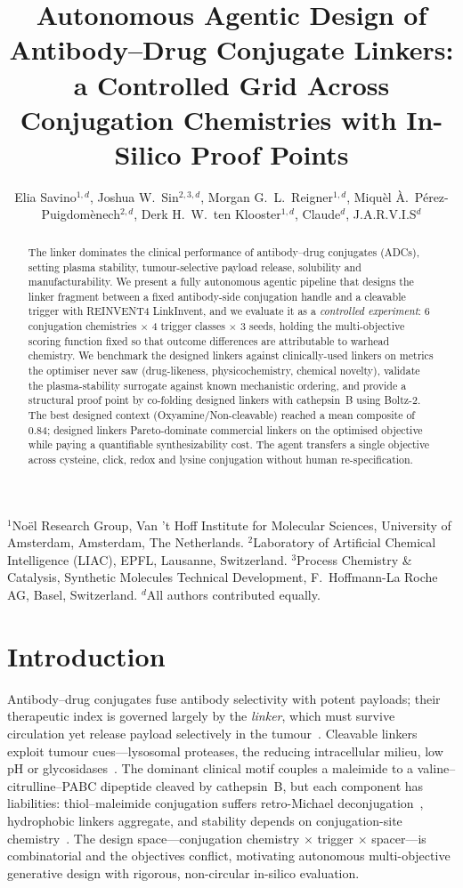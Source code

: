 \documentclass[10pt]{article}
\title{\textbf{Autonomous Agentic Design of Antibody--Drug Conjugate Linkers: a Controlled Grid Across Conjugation Chemistries with In-Silico Proof Points}}
\author{Elia Savino$^{1,d}$, Joshua W.\ Sin$^{2,3,d}$, Morgan G.\ L.\ Reigner$^{1,d}$, Miqu\`el \`A.\ P\'erez-Puigdom\`enech$^{2,d}$, Derk H.\ W.\ ten Klooster$^{1,d}$, Claude$^{d}$, J.A.R.V.I.S$^{d}$}
\date{}
\begin{document}
\maketitle
\begin{center}\footnotesize $^{1}$Noël Research Group, Van 't Hoff Institute for Molecular Sciences, University of Amsterdam, Amsterdam, The Netherlands. $^{2}$Laboratory of Artificial Chemical Intelligence (LIAC), EPFL, Lausanne, Switzerland. $^{3}$Process Chemistry \& Catalysis, Synthetic Molecules Technical Development, F.\ Hoffmann-La Roche AG, Basel, Switzerland. $^{d}$All authors contributed equally.\end{center}
\begin{abstract}
The linker dominates the clinical performance of antibody--drug conjugates (ADCs), setting plasma stability, tumour-selective payload release, solubility and manufacturability. We present a fully autonomous agentic pipeline that designs the linker fragment between a fixed antibody-side conjugation handle and a cleavable trigger with REINVENT4 LinkInvent, and we evaluate it as a \emph{controlled experiment}: 6 conjugation chemistries $\times$ 4 trigger classes $\times$ 3 seeds, holding the multi-objective scoring function fixed so that outcome differences are attributable to warhead chemistry. We benchmark the designed linkers against clinically-used linkers on metrics the optimiser never saw (drug-likeness, physicochemistry, chemical novelty), validate the plasma-stability surrogate against known mechanistic ordering, and provide a structural proof point by co-folding designed linkers with cathepsin~B using Boltz-2. The best designed context (Oxyamine/Non-cleavable) reached a mean composite of 0.84; designed linkers Pareto-dominate commercial linkers on the optimised objective while paying a quantifiable synthesizability cost. The agent transfers a single objective across cysteine, click, redox and lysine conjugation without human re-specification.
\end{abstract}
\section{Introduction}
Antibody--drug conjugates fuse antibody selectivity with potent payloads; their therapeutic index is governed largely by the \emph{linker}, which must survive circulation yet release payload selectively in the tumour~\cite{su2021,balamkundu2023}. Cleavable linkers exploit tumour cues---lysosomal proteases, the reducing intracellular milieu, low pH or glycosidases~\cite{peng2021}. The dominant clinical motif couples a maleimide to a valine--citrulline--PABC dipeptide cleaved by cathepsin~B, but each component has liabilities: thiol--maleimide conjugation suffers retro-Michael deconjugation~\cite{su2021}, hydrophobic linkers aggregate, and stability depends on conjugation-site chemistry~\cite{su2021zhang}. The design space---conjugation chemistry $\times$ trigger $\times$ spacer---is combinatorial and the objectives conflict, motivating autonomous multi-objective generative design with rigorous, non-circular in-silico evaluation.
\end{document}
